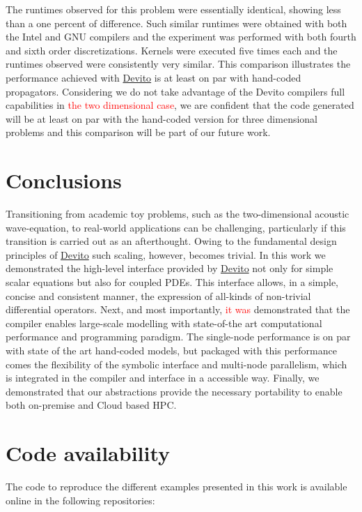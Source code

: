 \documentclass[10pt, conference]{IEEEtran}
\newcommand{\devito}{\href{https://github.com/devitocodes/devito}{Devito} }
\begin{document}
The runtimes observed for this problem were essentially identical,
showing less than a one percent of difference. Such similar runtimes were
obtained with both the Intel and GNU compilers and the
experiment was performed with both fourth and sixth order discretizations.
Kernels were executed five times each and the
runtimes observed were consistently very similar. This comparison
illustrates the performance achieved with \devito is at least on par with
hand-coded propagators. Considering we do not take advantage of the Devito
compilers full capabilities in \textcolor{red}{the two dimensional case}, we are confident
that the code generated will be at least on par with the hand-coded version
for three dimensional problems and this comparison will be part of our future
work.

\section{Conclusions}\label{conclusions}

Transitioning from academic toy problems, such as the two-dimensional
acoustic wave-equation, to real-world applications can be challenging,
particularly if this transition is carried out as an afterthought.
Owing to the fundamental design principles of \devito such scaling,
however, becomes trivial. In this work we demonstrated
the high-level interface provided by \devito not only for simple scalar
equations but also for coupled PDEs. This interface allows, in a simple, concise
and consistent manner, the expression of all-kinds of non-trivial
differential operators. Next, and most
importantly, \textcolor{red}{it was} demonstrated that the compiler enables large-scale modelling with
state-of-the art computational performance and programming paradigm. The
single-node performance is on par with state of the art hand-coded models, but
packaged with this performance comes
the flexibility of the symbolic interface and multi-node parallelism, which is
integrated in the compiler and interface in a accessible way. Finally,
we demonstrated that our abstractions provide the necessary portability
to enable both on-premise and Cloud based HPC.


\section{Code availability}

The code to reproduce the different examples presented in this work is available online in the following repositories:
\end{document}
